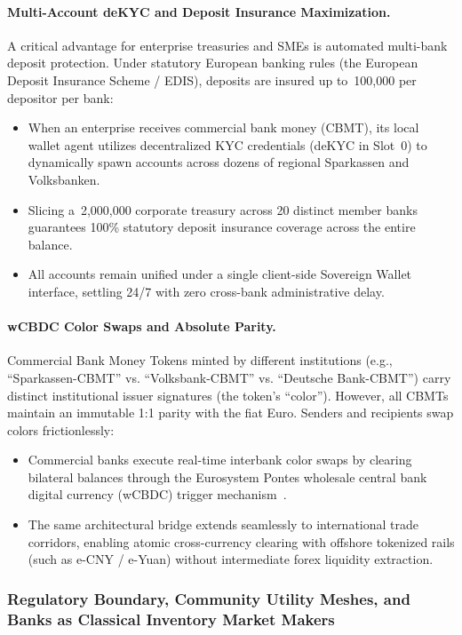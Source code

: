 \documentclass[a4paper,11pt,twoside,parskip=half-,headings=small]{scrartcl}
\newcommand{\EUR}[1]{\texteuro\,#1}
\begin{document}
\paragraph{Multi-Account deKYC and Deposit Insurance Maximization.}
A critical advantage for enterprise treasuries and SMEs is automated multi-bank deposit protection. Under statutory European banking rules (the European Deposit Insurance Scheme / EDIS), deposits are insured up to \EUR{100,000} per depositor per bank:
\begin{itemize}
  \item When an enterprise receives commercial bank money (CBMT), its local wallet agent utilizes decentralized KYC credentials (deKYC in Slot~0) to dynamically spawn accounts across dozens of regional Sparkassen and Volksbanken.
  \item Slicing a \EUR{2,000,000} corporate treasury across 20 distinct member banks guarantees 100\% statutory deposit insurance coverage across the entire balance.
  \item All accounts remain unified under a single client-side Sovereign Wallet interface, settling 24/7 with zero cross-bank administrative delay.
\end{itemize}

\paragraph{wCBDC Color Swaps and Absolute Parity.}
Commercial Bank Money Tokens minted by different institutions (e.g., ``Sparkassen-CBMT'' vs. ``Volksbank-CBMT'' vs. ``Deutsche Bank-CBMT'') carry distinct institutional issuer signatures (the token's ``color''). However, all CBMTs maintain an immutable 1:1 parity with the fiat Euro. Senders and recipients swap colors frictionlessly:
\begin{itemize}
  \item Commercial banks execute real-time interbank color swaps by clearing bilateral balances through the Eurosystem Pontes wholesale central bank digital currency (wCBDC) trigger mechanism~\cite{ecbpontes}.
  \item The same architectural bridge extends seamlessly to international trade corridors, enabling atomic cross-currency clearing with offshore tokenized rails (such as e-CNY / e-Yuan) without intermediate forex liquidity extraction.
\end{itemize}

\subsubsection{Regulatory Boundary, Community Utility Meshes, and Banks as Classical Inventory Market Makers}
\label{sec:bank_inventory_mm}
\end{document}
